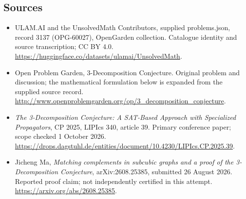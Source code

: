 \documentclass[11pt,a4paper]{article}
\begin{document}
\subsection{Sources}
\begin{itemize}
\item[S1] ULAM.AI and the UnsolvedMath Contributors, supplied problems.json, record 3137 (OPG-60027), OpenGarden collection. Catalogue identity and source transcription; CC BY 4.0.
\url{https://huggingface.co/datasets/ulamai/UnsolvedMath}.
\item[S2] Open Problem Garden, 3-Decomposition Conjecture. Original problem and discussion; the mathematical formulation below is expanded from the supplied source record.
\url{http://www.openproblemgarden.org/op/3_decomposition_conjecture}.

\item[R1] \emph{The 3-Decomposition Conjecture: A SAT-Based Approach
with Specialized Propagators}, CP 2025, LIPIcs 340, article 39.
Primary conference paper; scope checked 1 October 2026.
\url{https://drops.dagstuhl.de/entities/document/10.4230/LIPIcs.CP.2025.39}.
\item[R2] Jicheng Ma, \emph{Matching complements in subcubic graphs
and a proof of the 3-Decomposition Conjecture}, arXiv:2608.25385,
submitted 26 August 2026. Reported proof claim; not independently
certified in this attempt.
\url{https://arxiv.org/abs/2608.25385}.

\end{itemize}
\end{document}
